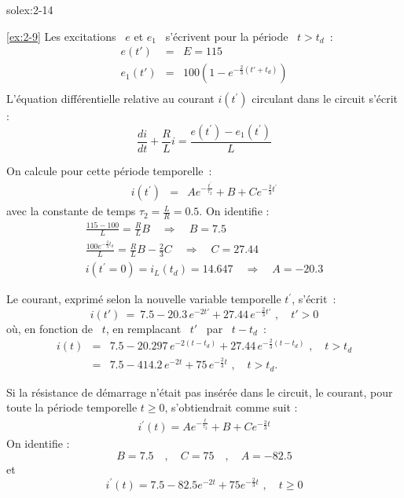 \begin{exwithsol}{solex:2-14}
\begin{solexercise}{\ref{ex:2-9}}
Les excitations \ $e$ et $e_1$ \ s'\'ecrivent pour la p\'eriode \ $t> t_d$~:
\begin{eqnarray*}
	e(t') &=& E=115 \\
	e_1(t') &=&100 \left( 1-e^{-\frac{2}{3}(t'+t_{d})} \right)\\
\end{eqnarray*}
L'\'equation diff\'erentielle relative au courant $i(t^{'})$ circulant dans le circuit s'\'ecrit :
\[\frac{di}{dt}+\frac{R}{L}i=\frac{e(t^{'})-e_1(t^{'})}{L}\]

On calcule pour cette p\'eriode temporelle~:
\begin{eqnarray*} 
	i(t^{'}) &=&  Ae^{-\frac{t^{'}}{\tau_2}}+B+Ce^{-\frac{2}{3}t^{'}}
\end{eqnarray*}
avec la constante de temps $\tau_2=\frac{L}{R}=0.5$.
On identifie :
\begin{align*}
\frac{115-100}{L}=\frac{R}{L}B\quad \Rightarrow \quad B=7.5\\
\frac{100e^{-\frac{2}{3}t_d}}{L}=\frac{R}{L}B -\frac{2}{3}C \quad \Rightarrow \quad C=27.44\\
i(t^{'}=0)=i_L(t_d)=14.647 \quad \Rightarrow \quad A=-20.3
\end{align*}


Le courant, exprim\'e selon la nouvelle variable temporelle $t^{'}$, s'\'ecrit~:
\[ i(t') \: = \: 7.5 - 20.3 \, e^{-2t'} + 27.44 \,
e^{-\frac{2}{3}t'} \,\, , \quad t'>0 \]
o\`u, en fonction de \ $t$, en rempla{c}ant \ $t'$ \ par \ $t-t_d$~:
\begin{eqnarray*}
	i(t) &=& 7.5 - 20.297 \, e^{-2(t-t_d)} + 27.44 \,
	e^{-\frac{2}{3}(t-t_d)} \,\, , \quad t > t_d\\
	&=& 7.5 - 414.2 \, e^{-2t} + 75 \, e^{-\frac{2}{3}t}  \,\, , \quad t > t_d.
\end{eqnarray*}

Si la r\'esistance de d\'emarrage n'\'etait pas  ins\'er\'ee dans le circuit,
le courant, pour toute la p\'eriode temporelle $t \geq  0$,
s'obtiendrait comme suit :
\begin{eqnarray*}
	i^{'}(t)=Ae^{-\frac{t}{\tau_2}}+B+Ce^{-\frac{2}{3}t}
\end{eqnarray*}
On identifie :
\[ B=7.5 \quad , \quad C=75 \quad , \quad A=-82.5\]
et
\[i^{'}(t)  =  7.5 - 82.5 e^{-2t} + 75 e^{-\frac{2}{3}
	t} \,\, , \quad t\geq 0\]


\end{solexercise}
\end{exwithsol}
